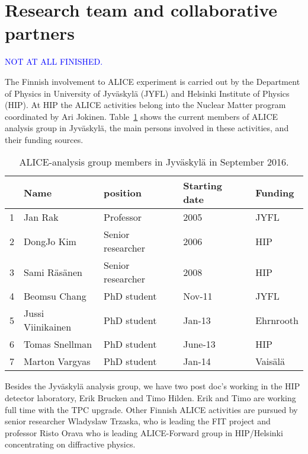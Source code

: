 
\section{Research team and collaborative partners} %
\label{sec:reseachteam}

\textcolor{blue}{NOT AT ALL FINISHED.}

The Finnish involvement to ALICE experiment is carried out by the Department of Physics in University of Jyv\"askyl\"a (JYFL) and Helsinki Institute of Physics (HIP). At HIP the ALICE activities belong into the Nuclear Matter program coordinated by Ari Jokinen. Table~\ref{tab:personnel} shows the current members of ALICE analysis group in Jyv\"askyl\"a, the main persons involved in these activities, and their funding sources.

\begin{table}[htp]
\caption{ALICE-analysis group members in Jyv\"askyl\"a in September 2016.}
\begin{center}
\begin{tabular}{|l|l|l|l|l|}
\hline
   &  Name                       &  position         & Starting date & Funding \\
\hline
1 &    Jan  Rak                  & Professor       &  2005           & JYFL \\
2 &    DongJo   Kim          & Senior researcher     &  2006           & HIP \\
3 &    Sami   R\"as\"anen & Senior researcher     &  2008           & HIP \\
 \hline
4 &    Beomsu   Chang     & PhD student   &  Nov-11       & JYFL \\
5 &    Jussi   Viinikainen   & PhD student   & Jan-13         &  Ehrnrooth   \\
6 &    Tomas Snellman     & PhD student   & June-13       & HIP\\
7 &    Marton Vargyas      & PhD student   & Jan-14         & Vais\"al\"a\\
\hline
\end{tabular}
\end{center}
\label{tab:personnel}
\end{table}%

Besides the Jyv\"askyl\"a analysis group, we have two post doc's working in the HIP detector laboratory, Erik Brucken and Timo Hilden. Erik and Timo are working full time with the TPC upgrade. Other Finnish ALICE activities are pursued by senior researcher Wladyslaw Trzaska, who is leading the FIT project and professor Risto Orava who is leading ALICE-Forward group in HIP/Helsinki concentrating on diffractive physics.

